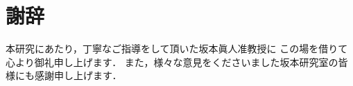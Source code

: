 \chapter*{謝辞}
\thispagestyle{fancy}
本研究にあたり，丁寧なご指導をして頂いた坂本眞人准教授に
この場を借りて心より御礼申し上げます．
また，様々な意見をくださいました坂本研究室の皆様にも感謝申し上げます．